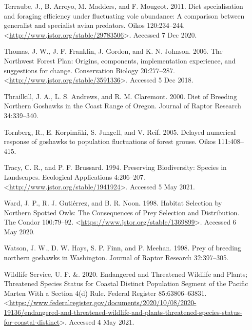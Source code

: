 \documentclass{sfuthesis}
\begin{document}
\leavevmode\hypertarget{ref-terraube_diet_2011}{}%
Terraube, J., B. Arroyo, M. Madders, and F. Mougeot. 2011. Diet specialisation and foraging efficiency under fluctuating vole abundance: A comparison between generalist and specialist avian predators. Oikos 120:234--244. \textless{}\url{http://www.jstor.org/stable/29783506}\textgreater. Accessed 7 Dec 2020.

\leavevmode\hypertarget{ref-thomas_northwest_2006}{}%
Thomas, J. W., J. F. Franklin, J. Gordon, and K. N. Johnson. 2006. The Northwest Forest Plan: Origins, components, implementation experience, and suggestions for change. Conservation Biology 20:277--287. \textless{}\url{http://www.jstor.org/stable/3591336}\textgreater. Accessed 5 Dec 2018.

\leavevmode\hypertarget{ref-thrailkill_diet_2000}{}%
Thrailkill, J. A., L. S. Andrews, and R. M. Claremont. 2000. Diet of Breeding Northern Goshawks in the Coast Range of Oregon. Journal of Raptor Research 34:339--340.

\leavevmode\hypertarget{ref-tornberg_delayed_2005}{}%
Tornberg, R., E. Korpimäki, S. Jungell, and V. Reif. 2005. Delayed numerical response of goshawks to population fluctuations of forest grouse. Oikos 111:408--415.

\leavevmode\hypertarget{ref-tracy_preserving_1994}{}%
Tracy, C. R., and P. F. Brussard. 1994. Preserving Biodiversity: Species in Landscapes. Ecological Applications 4:206--207. \textless{}\url{http://www.jstor.org/stable/1941924}\textgreater. Accessed 5 May 2021.

\leavevmode\hypertarget{ref-ward_habitat_1998}{}%
Ward, J. P., R. J. Gutiérrez, and B. R. Noon. 1998. Habitat Selection by Northern Spotted Owls: The Consequences of Prey Selection and Distribution. The Condor 100:79--92. \textless{}\url{https://www.jstor.org/stable/1369899}\textgreater. Accessed 6 May 2020.

\leavevmode\hypertarget{ref-watson_prey_1998}{}%
Watson, J. W., D. W. Hays, S. P. Finn, and P. Meehan. 1998. Prey of breeding northern goshawks in Washington. Journal of Raptor Research 32:397--305.

\leavevmode\hypertarget{ref-us_fish__wildlife_service_endangered_2020}{}%
Wildlife Service, U. F. \&. 2020. Endangered and Threatened Wildlife and Plants; Threatened Species Status for Coastal Distinct Population Segment of the Pacific Marten With a Section 4(d) Rule. Federal Register 85:63806--63831. \textless{}\url{https://www.federalregister.gov/documents/2020/10/08/2020-19136/endangered-and-threatened-wildlife-and-plants-threatened-species-status-for-coastal-distinct}\textgreater. Accessed 4 May 2021.
\end{document}
